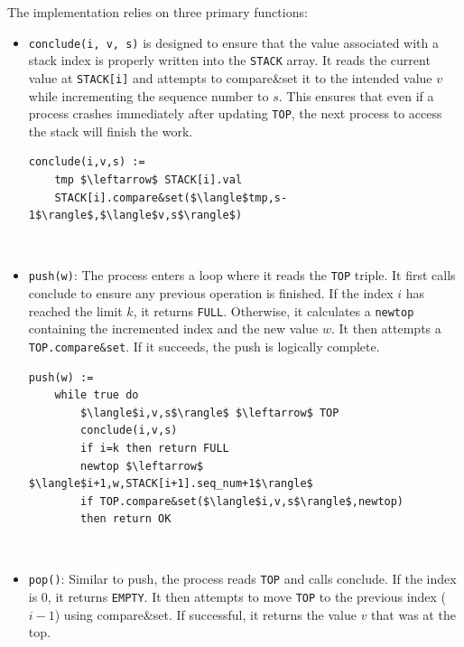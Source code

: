 The implementation relies on three primary functions:
\begin{itemize}
    \item \texttt{conclude(i, v, s)} is designed to ensure that the value associated with a stack index is properly written into the \texttt{STACK} array. It reads the current value at \texttt{STACK[i]} and attempts to compare\&set it to the intended value $v$ while incrementing the sequence number to $s$. This ensures that even if a process crashes immediately after updating \texttt{TOP}, the next process to access the stack will finish the work.

\begin{minipage}{\textwidth}
\begin{lstlisting}[mathescape]
conclude(i,v,s) :=
    tmp $\leftarrow$ STACK[i].val
    STACK[i].compare&set($\langle$tmp,s-1$\rangle$,$\langle$v,s$\rangle$)
\end{lstlisting}
\end{minipage}\\
    
    \item \texttt{push(w)}: The process enters a loop where it reads the \texttt{TOP} triple. It first calls conclude to ensure any previous operation is finished. If the index $i$ has reached the limit $k$, it returns \texttt{FULL}. Otherwise, it calculates a \texttt{newtop} containing the incremented index and the new value $w$. It then attempts a \texttt{TOP.compare\&set}. If it succeeds, the push is logically complete.

\begin{minipage}{\textwidth}
\begin{lstlisting}[mathescape]
push(w) :=
    while true do
        $\langle$i,v,s$\rangle$ $\leftarrow$ TOP
        conclude(i,v,s)
        if i=k then return FULL
        newtop $\leftarrow$ $\langle$i+1,w,STACK[i+1].seq_num+1$\rangle$
        if TOP.compare&set($\langle$i,v,s$\rangle$,newtop)
        then return OK
\end{lstlisting}
\end{minipage}\\
    
    \item \texttt{pop()}: Similar to push, the process reads \texttt{TOP} and calls conclude. If the index is 0, it returns \texttt{EMPTY}. It then attempts to move \texttt{TOP} to the previous index ($i-1$) using compare\&set. If successful, it returns the value $v$ that was at the top.


\end{itemize}
